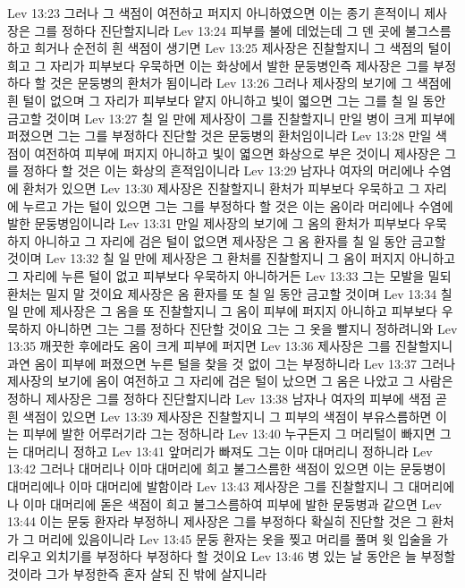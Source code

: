 Lev 13:23  그러나 그 색점이 여전하고 퍼지지 아니하였으면 이는 종기 흔적이니 제사장은 그를 정하다 진단할지니라
Lev 13:24  피부를 불에 데었는데 그 덴 곳에 불그스름하고 희거나 순전히 흰 색점이 생기면
Lev 13:25  제사장은 진찰할지니 그 색점의 털이 희고 그 자리가 피부보다 우묵하면 이는 화상에서 발한 문둥병인즉 제사장은 그를 부정하다 할 것은 문둥병의 환처가 됨이니라
Lev 13:26  그러나 제사장의 보기에 그 색점에 흰 털이 없으며 그 자리가 피부보다 얕지 아니하고 빛이 엷으면 그는 그를 칠 일 동안 금고할 것이며
Lev 13:27  칠 일 만에 제사장이 그를 진찰할지니 만일 병이 크게 피부에 퍼졌으면 그는 그를 부정하다 진단할 것은 문둥병의 환처임이니라
Lev 13:28  만일 색점이 여전하여 피부에 퍼지지 아니하고 빛이 엷으면 화상으로 부은 것이니 제사장은 그를 정하다 할 것은 이는 화상의 흔적임이니라
Lev 13:29  남자나 여자의 머리에나 수염에 환처가 있으면
Lev 13:30  제사장은 진찰할지니 환처가 피부보다 우묵하고 그 자리에 누르고 가는 털이 있으면 그는 그를 부정하다 할 것은 이는 옴이라 머리에나 수염에 발한 문둥병임이니라
Lev 13:31  만일 제사장의 보기에 그 옴의 환처가 피부보다 우묵하지 아니하고 그 자리에 검은 털이 없으면 제사장은 그 옴 환자를 칠 일 동안 금고할 것이며
Lev 13:32  칠 일 만에 제사장은 그 환처를 진찰할지니 그 옴이 퍼지지 아니하고 그 자리에 누른 털이 없고 피부보다 우묵하지 아니하거든
Lev 13:33  그는 모발을 밀되 환처는 밀지 말 것이요 제사장은 옴 환자를 또 칠 일 동안 금고할 것이며
Lev 13:34  칠 일 만에 제사장은 그 옴을 또 진찰할지니 그 옴이 피부에 퍼지지 아니하고 피부보다 우묵하지 아니하면 그는 그를 정하다 진단할 것이요 그는 그 옷을 빨지니 정하려니와
Lev 13:35  깨끗한 후에라도 옴이 크게 피부에 퍼지면
Lev 13:36  제사장은 그를 진찰할지니 과연 옴이 피부에 퍼졌으면 누른 털을 찾을 것 없이 그는 부정하니라
Lev 13:37  그러나 제사장의 보기에 옴이 여전하고 그 자리에 검은 털이 났으면 그 옴은 나았고 그 사람은 정하니 제사장은 그를 정하다 진단할지니라
Lev 13:38  남자나 여자의 피부에 색점 곧 흰 색점이 있으면
Lev 13:39  제사장은 진찰할지니 그 피부의 색점이 부유스름하면 이는 피부에 발한 어루러기라 그는 정하니라
Lev 13:40  누구든지 그 머리털이 빠지면 그는 대머리니 정하고
Lev 13:41  앞머리가 빠져도 그는 이마 대머리니 정하니라
Lev 13:42  그러나 대머리나 이마 대머리에 희고 불그스름한 색점이 있으면 이는 문둥병이 대머리에나 이마 대머리에 발함이라
Lev 13:43  제사장은 그를 진찰할지니 그 대머리에나 이마 대머리에 돋은 색점이 희고 불그스름하여 피부에 발한 문둥병과 같으면
Lev 13:44  이는 문둥 환자라 부정하니 제사장은 그를 부정하다 확실히 진단할 것은 그 환처가 그 머리에 있음이니라
Lev 13:45  문둥 환자는 옷을 찢고 머리를 풀며 윗 입술을 가리우고 외치기를 부정하다 부정하다 할 것이요
Lev 13:46  병 있는 날 동안은 늘 부정할 것이라 그가 부정한즉 혼자 살되 진 밖에 살지니라
